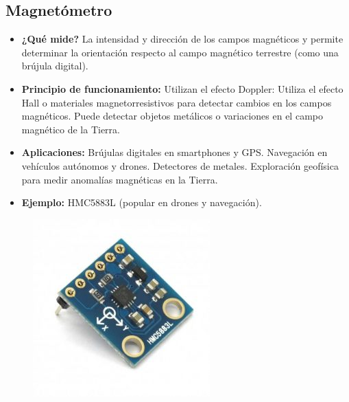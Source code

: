 \subsection*{Magnetómetro}
\begin{itemize}
	\item \textbf{¿Qué mide?} La intensidad y dirección de los campos magnéticos y permite determinar la orientación respecto al campo magnético terrestre (como una brújula digital).
	\item \textbf{Principio de funcionamiento:} Utilizan el efecto Doppler: Utiliza el efecto Hall o materiales magnetorresistivos para detectar cambios en los campos magnéticos.
	Puede detectar objetos metálicos o variaciones en el campo magnético de la Tierra.
	\item \textbf{Aplicaciones:} Brújulas digitales en smartphones y GPS.
	Navegación en vehículos autónomos y drones.
	Detectores de metales.
	Exploración geofísica para medir anomalías magnéticas en la Tierra.
	\item \textbf{Ejemplo:} HMC5883L (popular en drones y navegación).
\end{itemize}
\begin{figure}[h]
	\centering
	\includegraphics[width=0.3\linewidth]{img/magnetometro}
	\label{fig:magnetometro}
\end{figure}

